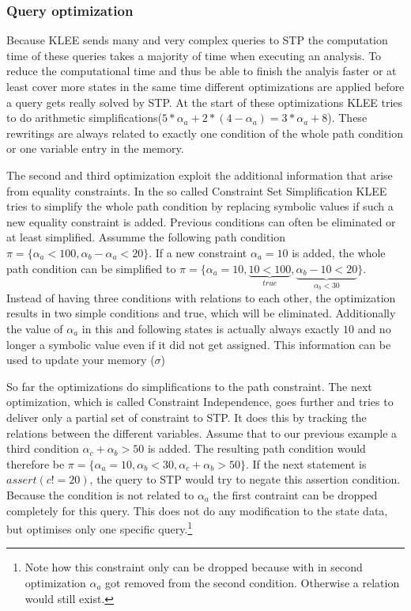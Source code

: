 \subsubsection{Query optimization}
Because KLEE sends many and very complex queries to STP the computation time of these queries takes a majority of time when executing an analysis. To reduce the computational time and thus be able to finish the analyis faster or at least cover more states in the same time different optimizations are applied before a query gets really solved by STP. 
At the start of these optimizations KLEE tries to do arithmetic simplifications($5*\alpha_a + 2*(4-\alpha_a) = 3 * \alpha_a + 8$). These rewritings are always related to exactly one condition of the whole path condition or one variable entry in the memory.

The second and third optimization exploit the additional information that arise from equality constraints. In the so called Constraint Set Simplification KLEE tries to simplify the whole path condition by replacing symbolic values if such a new equality constraint is added. Previous conditions can often be eliminated or at least simplified. 
Assumme the following path condition $\pi = \{\alpha_a < 100, \alpha_b - \alpha_a< 20\}$. If a new constraint $\alpha_a = 10$ is added, the whole path condition can be simplified to $\pi = \{\alpha_a = 10, \underbrace{10 < 100}_{true},\underbrace{\alpha_b - 10 < 20}_{\alpha_b < 30}\}$. Instead of having three conditions with relations to each other, the optimization results in two simple conditions and true, which will be eliminated. Additionally the value of $\alpha_a$ in this and following states is actually always exactly $10$ and no longer a symbolic value even if it did not get assigned. This information can be used to update your memory ($\sigma$)

So far the optimizations do simplifications to the path constraint. The next optimization, which is called Constraint Independence, goes further and tries to deliver only a partial set of constraint to STP. It does this by tracking the relations between the different variables. Assume that to our previous example a third condition $\alpha_c + \alpha_b > 50$ is added. The resulting path condition would therefore be $\pi = \{\alpha_a = 10, \alpha_b < 30, \alpha_c + \alpha_b > 50\}$. If the next statement is $assert(c != 20)$, the query to STP would try to negate this assertion condition. Because the condition is not related to $\alpha_a$ the first contraint can be dropped completely for this query. This does not do any modification to the state data, but optimises only one specific query.\footnote{Note how this constraint only can be dropped because with in second optimization $\alpha_a$ got removed from the second condition. Otherwise a relation would still exist.}

